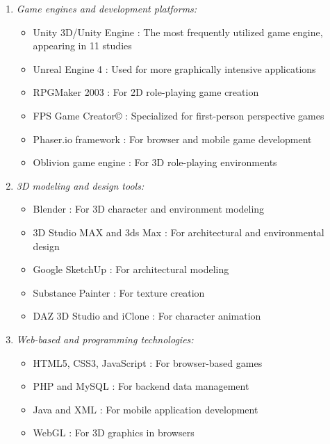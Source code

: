 \documentclass[a4paper,fleqn]{cas-sc}
\begin{document}
\begin{enumerate}[noitemsep]
	\item 
\textit{Game engines and development platforms:}
\begin{itemize}[noitemsep]
 \item Unity 3D/Unity Engine \citep{2Mahamarowi2023133, 9Lin2018, 10Huaman2019220, 22Nugroho2020149, 31DeAmicis2009451, 32Cheng20241718, 39Tegos2014838, 40Kuran2018, 52Lin2011265, 73Wolfartsberger2011160, 77Ramansyah2021}: The most frequently utilized game engine, appearing in 11 studies
 \item Unreal Engine 4 \citep{2Mahamarowi2023133, 17Manzanares2019, 64Hsu201324}: Used for more graphically intensive applications
 \item RPGMaker 2003 \citep{60Hoy2018}: For 2D role-playing game creation
 \item FPS Game Creator© \citep{16Chen201447}: Specialized for first-person perspective games
 \item Phaser.io framework \citep{13Humpire2022}: For browser and mobile game development
 \item Oblivion game engine \citep{18Shih201054}: For 3D role-playing environments
\end{itemize}

	\item 
\textit{3D modeling and design tools:}
\begin{itemize}[noitemsep]
 \item Blender \citep{2Mahamarowi2023133, 44Shiue2016}: For 3D character and environment modeling
 \item 3D Studio MAX and 3ds Max \citep{1Barbatsis201159, 18Shih201054}: For architectural and environmental design
 \item Google SketchUp \citep{25Repantis2011502}: For architectural modeling
 \item Substance Painter \citep{2Mahamarowi2023133}: For texture creation
 \item DAZ 3D Studio and iClone \citep{25Repantis2011502}: For character animation
\end{itemize}

	\item 
\textit{Web-based and programming technologies:}
\begin{itemize}[noitemsep]
 \item HTML5, CSS3, JavaScript \citep{1Barbatsis201159, 19Chou2019, 47Clara2010156}: For browser-based games
 \item PHP and MySQL \citep{1Barbatsis201159, 6Czerwinski2018}: For backend data management
 \item Java and XML \citep{21Ghulamani2017}: For mobile application development
 \item WebGL \citep{22Nugroho2020149}: For 3D graphics in browsers
\end{itemize}


\end{enumerate}
\end{document}
